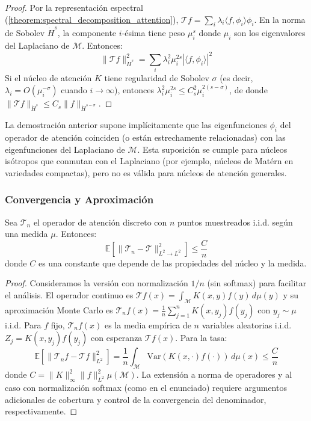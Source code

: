 \begin{proof}
Por la representación espectral (\autoref{theorem:spectral_decomposition_attention}), $\mathcal{T}f = \sum_i \lambda_i \langle f, \phi_i\rangle \phi_i$. En la norma de Sobolev $\dot{H}^s$, la componente $i$-ésima tiene peso $\mu_i^s$ donde $\mu_i$ son los eigenvalores del Laplaciano de $\mathcal{M}$. Entonces:
\[
\|\mathcal{T}f\|_{\dot{H}^s}^2 = \sum_i \lambda_i^2 \mu_i^{2s} |\langle f, \phi_i\rangle|^2
\]
Si el núcleo de atención $K$ tiene regularidad de Sobolev $\sigma$ (es decir, $\lambda_i = O(\mu_i^{-\sigma})$ cuando $i \to \infty$), entonces $\lambda_i^2 \mu_i^{2s} \leq C_s^2 \mu_i^{2(s-\sigma)}$, de donde $\|\mathcal{T}f\|_{\dot{H}^s} \leq C_s \|f\|_{\dot{H}^{s-\sigma}}$.
\end{proof}

\begin{remark}
La demostración anterior supone implícitamente que las eigenfunciones $\phi_i$ del operador de atención coinciden (o están estrechamente relacionadas) con las eigenfunciones del Laplaciano de $\mathcal{M}$. Esta suposición se cumple para núcleos isótropos que conmutan con el Laplaciano (por ejemplo, núcleos de Matérn en variedades compactas), pero no es válida para núcleos de atención generales.
\end{remark}

\subsubsection{Convergencia y Aproximación}

\begin{theorem}\label{theorem:monte_carlo_convergence}
    Sea $\mathcal{T}_n$ el operador de atención discreto con $n$ puntos muestreados i.i.d. según una medida $\mu$. Entonces:
    \begin{equation}
        \mathbb{E}[\|\mathcal{T}_n - \mathcal{T}\|_{L^2 \to L^2}^2] \leq \frac{C}{n}
        \label{eq:monte_carlo_rate}
    \end{equation}
    donde $C$ es una constante que depende de las propiedades del núcleo y la medida.
\end{theorem}

\begin{proof}
Consideramos la versión con normalización $1/n$ (sin softmax) para facilitar el análisis. El operador continuo es $\mathcal{T}f(x) = \int_\mathcal{M} K(x,y) f(y)\, d\mu(y)$ y su aproximación Monte Carlo es $\mathcal{T}_n f(x) = \frac{1}{n}\sum_{j=1}^n K(x, y_j) f(y_j)$ con $y_j \sim \mu$ i.i.d. Para $f$ fijo, $\mathcal{T}_n f(x)$ es la media empírica de $n$ variables aleatorias i.i.d. $Z_j = K(x, y_j)f(y_j)$ con esperanza $\mathcal{T}f(x)$. Para la tasa:
\[
\mathbb{E}[\|\mathcal{T}_n f - \mathcal{T}f\|_{L^2}^2] = \frac{1}{n}\int_\mathcal{M} \text{Var}(K(x,\cdot)f(\cdot))\, d\mu(x) \leq \frac{C}{n}
\]
donde $C = \|K\|_\infty^2 \|f\|_{L^2}^2 \mu(\mathcal{M})$. La extensión a norma de operadores y al caso con normalización softmax (como en el enunciado) requiere argumentos adicionales de cobertura y control de la convergencia del denominador, respectivamente.
\end{proof}

